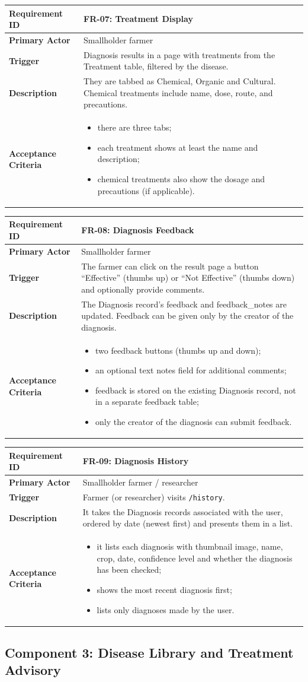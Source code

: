 \documentclass[12pt,a4paper]{article}
\newcommand{\frbox}[5]{%
  \begin{table}[H]
  \centering
  \begin{tabularx}{\textwidth}{|l|X|}
  \hline
  \rowcolor{lightgreen}
  \textbf{Requirement ID} & \textbf{#1} \\
  \hline
  \textbf{Primary Actor} & #2 \\
  \hline
  \textbf{Trigger} & #3 \\
  \hline
  \textbf{Description} & #4 \\
  \hline
  \rowcolor{lightgreen}
  \textbf{Acceptance Criteria} & #5 \\
  \hline
  \end{tabularx}
  \end{table}
}
\begin{document}
\frbox{FR-07: Treatment Display}
{Smallholder farmer}
{Diagnosis results in a page with treatments from the Treatment table, filtered by the disease.}
{They are tabbed as Chemical, Organic and Cultural. Chemical treatments include name, dose, route, and precautions.}
{%
\begin{itemize}[leftmargin=1.5em]
  \item there are three tabs;
  \item each treatment shows at least the name and description;
  \item chemical treatments also show the dosage and precautions (if applicable).
\end{itemize}
}

\frbox{FR-08: Diagnosis Feedback}
{Smallholder farmer}
{The farmer can click on the result page a button ``Effective'' (thumbs up) or ``Not Effective'' (thumbs down) and optionally provide comments.}
{The Diagnosis record's feedback and feedback\_notes are updated. Feedback can be given only by the creator of the diagnosis.}
{%
\begin{itemize}[leftmargin=1.5em]
  \item two feedback buttons (thumbs up and down);
  \item an optional text notes field for additional comments;
  \item feedback is stored on the existing Diagnosis record, not in a separate feedback table;
  \item only the creator of the diagnosis can submit feedback.
\end{itemize}
}

\frbox{FR-09: Diagnosis History}
{Smallholder farmer / researcher}
{Farmer (or researcher) visits \texttt{/history}.}
{It takes the Diagnosis records associated with the user, ordered by date (newest first) and presents them in a list.}
{%
\begin{itemize}[leftmargin=1.5em]
  \item it lists each diagnosis with thumbnail image, name, crop, date, confidence level and whether the diagnosis has been checked;
  \item shows the most recent diagnosis first;
  \item lists only diagnoses made by the user.
\end{itemize}
}


\subsection{Component 3: Disease Library and Treatment Advisory}
\end{document}
